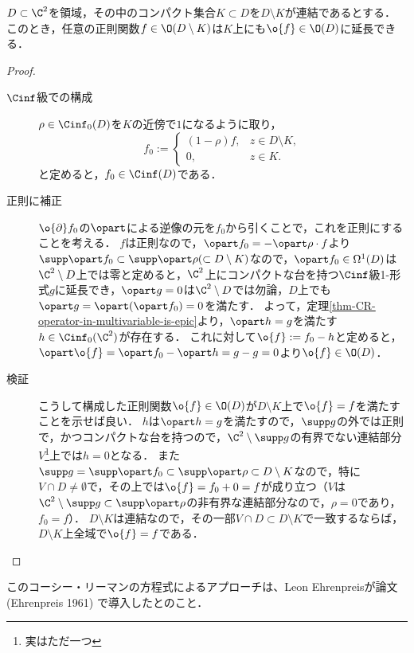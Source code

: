 \documentclass[uplatex, dvipdfmx]{jsreport}
\begin{document}
\begin{theorem}[Hartogs (1906)]\label{thm-Hartogs}
    $D\subset\C^2$を領域，その中のコンパクト集合$K\subset D$を$D\setminus K$が連結であるとする．
    このとき，任意の正則関数$f\in\O(D\setminus K)$は$K$上にも$\o{f}\in\O(D)$に延長できる．
\end{theorem}
\begin{proof}\mbox{}
    \begin{description}
        \item[$\Cinf$級での構成] 
        $\rho\in\Cinf_0(D)$を$K$の近傍で$1$になるように取り，\[f_0:=\begin{cases}(1-\rho)f,&z\in D\setminus K,\\0,&z\in K.\end{cases}\]と定めると，$f_0\in\Cinf(D)$である．
        \item[正則に補正]
        $\o{\partial}f_0$の$\opart$による逆像の元を$f_0$から引くことで，これを正則にすることを考える．
        $f$は正則なので，$\opart f_0=-\opart\rho\cdot f$より$\supp\opart f_0\subset\supp\opart\rho(\subset D\setminus K)$なので，$\opart f_0\in\Omega^1(D)$は$\C^2\setminus D$上では零と定めると，$\C^2$上にコンパクトな台を持つ$\Cinf$級1-形式$g$に延長でき，$\opart g=0$は$\C^2\setminus D$では勿論，$D$上でも$\opart g=\opart(\opart f_0)=0$を満たす．
        よって，定理\ref{thm-CR-operator-in-multivariable-is-epic}より，$\opart h=g$を満たす$h\in\Cinf_0(\C^2)$が存在する．
        これに対して$\o{f}:=f_0-h$と定めると，$\opart\o{f}=\opart f_0-\opart h=g-g=0$より$\o{f}\in\O(D)$．
        \item[検証] こうして構成した正則関数$\o{f}\in\O(D)$が$D\setminus K$上で$\o{f}=f$を満たすことを示せば良い．
        $h$は$\opart h=g$を満たすので，$\supp g$の外では正則で，かつコンパクトな台を持つので，$\C^2\setminus\supp g$の有界でない連結部分$V$\footnote{実はただ一つ}上では$h=0$となる．
        また$\supp g=\supp\opart f_0\subset\supp\opart\rho\subset D\setminus K$なので，特に$V\cap D\ne\emptyset$で，その上では$\o{f}=f_0+0=f$が成り立つ（$V$は$\C^2\setminus\supp g\subset\supp\opart\rho$の非有界な連結部分なので，$\rho=0$であり，$f_0=f$）．
        $D\setminus K$は連結なので，その一部$V\cap D\subset D\setminus K$で一致するならば，$D\setminus K$上全域で$\o{f}=f$である．
    \end{description}
\end{proof}
\begin{remark}
    このコーシー・リーマンの方程式によるアプローチは、Leon Ehrenpreisが論文 (Ehrenpreis 1961) で導入したとのこと．
\end{remark}
\end{document}
